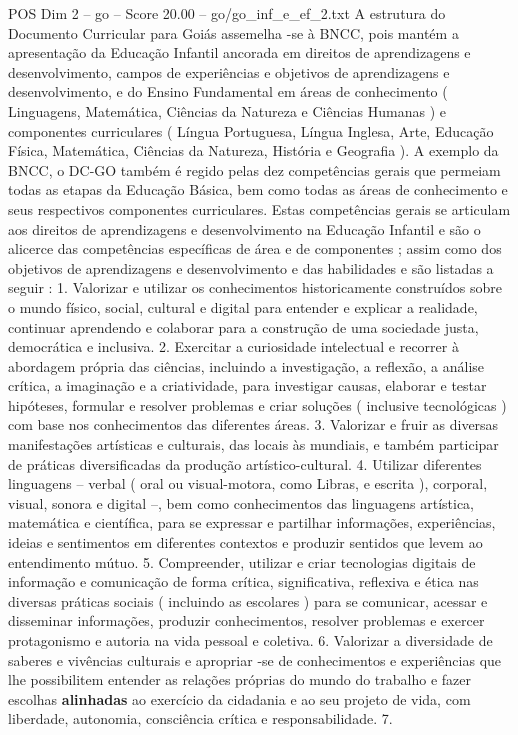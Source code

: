 \begin{textsample}{POS Dim 2 – go – Score 20.00 – go/go\_inf\_e\_ef\_2.txt}
A estrutura do Documento Curricular para Goiás assemelha -se à BNCC, pois mantém a apresentação da Educação Infantil ancorada em direitos de aprendizagens e desenvolvimento, campos de experiências e objetivos de aprendizagens e desenvolvimento, e do Ensino Fundamental em áreas de conhecimento ( Linguagens, Matemática, Ciências da Natureza e Ciências Humanas ) e componentes curriculares ( Língua Portuguesa, Língua Inglesa, Arte, Educação Física, Matemática, Ciências da Natureza, História e Geografia ).
A exemplo da BNCC, o DC-GO também é regido pelas dez competências gerais que permeiam todas as etapas da Educação Básica, bem como todas as áreas de conhecimento e seus respectivos componentes curriculares.
Estas competências gerais se articulam aos direitos de aprendizagens e desenvolvimento na Educação Infantil e são o alicerce das competências específicas de área e de componentes ; assim como dos objetivos de aprendizagens e desenvolvimento e das habilidades e são listadas a seguir : 1.
Valorizar e utilizar os conhecimentos historicamente construídos sobre o mundo físico, social, cultural e digital para entender e explicar a realidade, continuar aprendendo e colaborar para a construção de uma sociedade justa, democrática e inclusiva. 2.
Exercitar a curiosidade intelectual e recorrer à abordagem própria das ciências, incluindo a investigação, a reflexão, a análise crítica, a imaginação e a criatividade, para investigar causas, elaborar e testar hipóteses, formular e resolver problemas e criar soluções ( inclusive tecnológicas ) com base nos conhecimentos das diferentes áreas. 3.
Valorizar e fruir as diversas manifestações artísticas e culturais, das locais às mundiais, e também participar de práticas diversificadas da produção artístico-cultural. 4.
Utilizar diferentes linguagens – verbal ( oral ou visual-motora, como Libras, e escrita ), corporal, visual, sonora e digital –, bem como conhecimentos das linguagens artística, matemática e científica, para se expressar e partilhar informações, experiências, ideias e sentimentos em diferentes contextos e produzir sentidos que levem ao entendimento mútuo. 5.
Compreender, utilizar e criar tecnologias digitais de informação e comunicação de forma crítica, significativa, reflexiva e ética nas diversas práticas sociais ( incluindo as escolares ) para se comunicar, acessar e disseminar informações, produzir conhecimentos, resolver problemas e exercer protagonismo e autoria na vida pessoal e coletiva. 6.
Valorizar a diversidade de saberes e vivências culturais e apropriar -se de conhecimentos e experiências que lhe possibilitem entender as relações próprias do mundo do trabalho e fazer escolhas \textbf{alinhadas} ao exercício da cidadania e ao seu projeto de vida, com liberdade, autonomia, consciência crítica e responsabilidade. 7.

\end{textsample}
